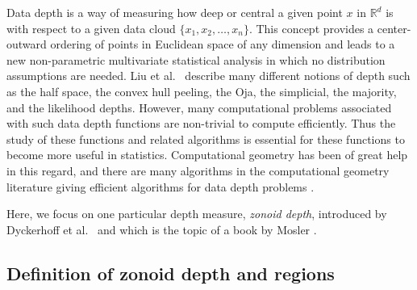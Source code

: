 \documentclass[charterfonts,lotsofwhite]{patmorin}
\begin{document}
Data depth is a way of measuring how deep or central a given point $x$
in $\mathbb{R}^d$ is with respect to a given data cloud $\{x_1, x_2,
\ldots, x_n\}$. This concept provides a center-outward ordering of
points in Euclidean space of any dimension and leads to a new
non-parametric multivariate statistical analysis in which no
distribution assumptions are needed. Liu et al.\
\cite{multivariate_analysis_by_data_depth} describe many different
notions of depth such as the half space, the convex hull peeling, the
Oja, the simplicial, the majority, and the likelihood depths. However,
many computational problems associated with such data depth functions
are non-trivial to compute efficiently.  Thus the study of these
functions and related algorithms is essential for these functions to
become more useful in statistics. Computational geometry
\cite{preparata_book} has been of great help in this regard, and there
are many algorithms in the computational geometry literature giving
efficient algorithms for data depth problems
\cite{regression_depth_and_center_points, aloupis_mcs_thesis,
algorithms_for_bivariate_medians_and_a_fermat_torricelli_problem_for_lines,
an_optimized_randomized_algorithm_for_maximum_tukey_depth,
on_khulls_and_related_problems,
zonoid_data_depth_theory_and_computation,
algorithms_for_bivariate_zonoid_depth,
computing_the_centerpoint_of_a_finite_planar_set_of_points_in_linear_time,
on_a_triangle_counting_problem, langerman_phd_thesis,
the_complexity_of_hyperplane_depth_in_the_plane,
optimization_in_arrangements,
computing_the_center_of_planar_point_sets,
fast_implementation_of_depth_contours_using_topological_sweep,
statistical_algorithms_the_oja_bivariate_median,
efficient_algorithms_for_maximum_regression_depth,
a_lower_bound_for_computing_oja_depth,
on_the_computation_of_the_bivariate_median_and_a_fermat_torricelli_problem,
on_the_convex_layers_of_a_planar_set,
on_algorithms_for_simplicial_depth,
constructing_the_bivariate_tukey_median,
geometry_and_statistics_problems_at_the_interface,
some_new_algorithms_and_software_implementation_methods_for_pattern_recognition_research}.

Here, we focus on one particular depth measure, \emph{zonoid depth},
introduced by Dyckerhoff et al.\
\cite{zonoid_data_depth_theory_and_computation} and which is the topic
of a book by Mosler \cite{mosler_book}.

\subsection{Definition of zonoid depth and regions}
\label{subsection_definition_of_zonoid_depth_and_regions}
\end{document}
